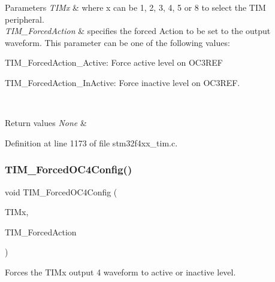 \begin{DoxyParams}{Parameters}
{\em T\+I\+Mx} & where x can be 1, 2, 3, 4, 5 or 8 to select the T\+IM peripheral. \\
\hline
{\em T\+I\+M\+\_\+\+Forced\+Action} & specifies the forced Action to be set to the output waveform. This parameter can be one of the following values\+: \begin{DoxyItemize}
\item T\+I\+M\+\_\+\+Forced\+Action\+\_\+\+Active\+: Force active level on O\+C3\+R\+EF \item T\+I\+M\+\_\+\+Forced\+Action\+\_\+\+In\+Active\+: Force inactive level on O\+C3\+R\+EF. \end{DoxyItemize}
\\
\hline
\end{DoxyParams}

\begin{DoxyRetVals}{Return values}
{\em None} & \\
\hline
\end{DoxyRetVals}


Definition at line 1173 of file stm32f4xx\+\_\+tim.\+c.

\mbox{\label{group___t_i_m___group2_gaf0a0bbe74251e56d4b835d20b0a3aa63}} 
\subsubsection{\texorpdfstring{T\+I\+M\+\_\+\+Forced\+O\+C4\+Config()}{TIM\_ForcedOC4Config()}}
{\footnotesize\ttfamily void T\+I\+M\+\_\+\+Forced\+O\+C4\+Config (\begin{DoxyParamCaption}\item[{\hyperlink{struct_t_i_m___type_def}{T\+I\+M\+\_\+\+Type\+Def} $\ast$}]{T\+I\+Mx,  }\item[{uint16\+\_\+t}]{T\+I\+M\+\_\+\+Forced\+Action }\end{DoxyParamCaption})}



Forces the T\+I\+Mx output 4 waveform to active or inactive level. 


